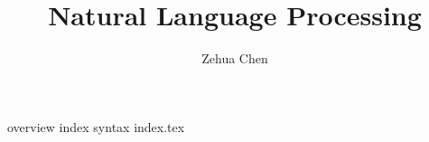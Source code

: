 \documentclass[letterpaper, 11pt]{report}
\title{Natural Language Processing}
\author{Zehua Chen}
\begin{document}
  \maketitle
  \tableofcontents

  {overview}
  {index}
  {syntax}
  {index.tex}
\end{document}
